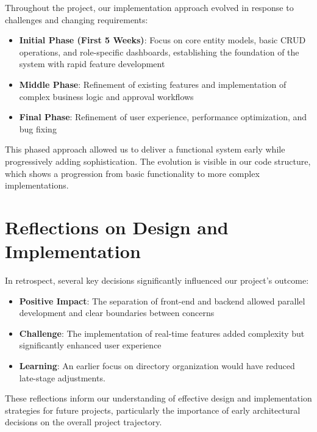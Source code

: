 Throughout the project, our implementation approach evolved in response to challenges and changing requirements:

\begin{itemize}
    \item \textbf{Initial Phase (First 5 Weeks)}: Focus on core entity models, basic CRUD operations, and role-specific dashboards, establishing the foundation of the system with rapid feature development
    \item \textbf{Middle Phase}: Refinement of existing features and implementation of complex business logic and approval workflows
    \item \textbf{Final Phase}: Refinement of user experience, performance optimization, and bug fixing
\end{itemize}

This phased approach allowed us to deliver a functional system early while progressively adding sophistication. The evolution is visible in our code structure, which shows a progression from basic functionality to more complex implementations.

\section{Reflections on Design and Implementation}

In retrospect, several key decisions significantly influenced our project's outcome:

\begin{itemize}
    \item \textbf{Positive Impact}: The separation of front-end and backend allowed parallel development and clear boundaries between concerns
    \item \textbf{Challenge}: The implementation of real-time features added complexity but significantly enhanced user experience
    \item \textbf{Learning}: An earlier focus on directory organization would have reduced late-stage adjustments.
\end{itemize}

These reflections inform our understanding of effective design and implementation strategies for future projects, particularly the importance of early architectural decisions on the overall project trajectory.